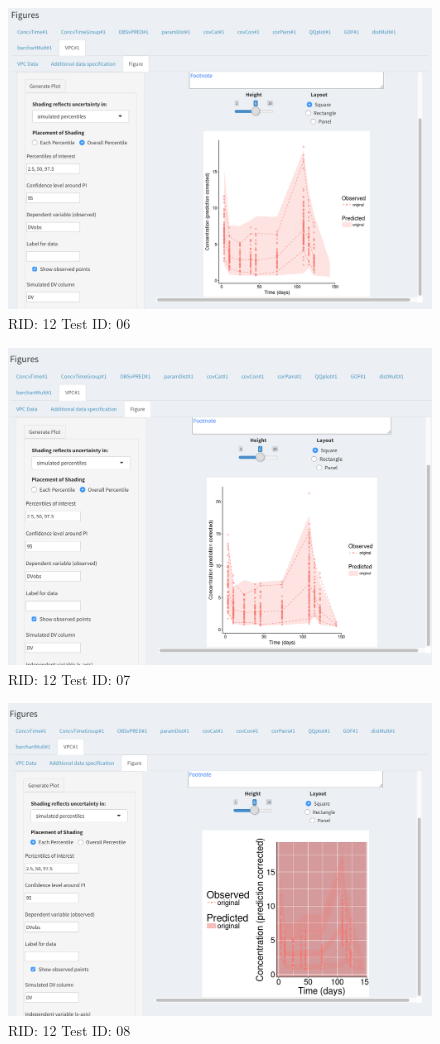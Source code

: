 \begin{figure}[H]
\includegraphics[width=.8\textwidth]{screencaps/12-06-1.png}
\caption{RID: 12 Test ID: 06}
\end{figure}
\begin{figure}[H]
\includegraphics[width=.8\textwidth]{screencaps/12-07-1.png}
\caption{RID: 12 Test ID: 07}
\end{figure}
\begin{figure}[H]
\includegraphics[width=.8\textwidth]{screencaps/12-08-1.png}
\caption{RID: 12 Test ID: 08}
\end{figure}
